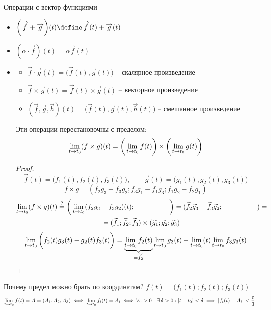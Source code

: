 \begin{undefthm}{Операции с вектор-функциями}
	\hfill
	\begin{itemize}
		\item $ \bigg( \vec{f} + \vec{g} \bigg )(t) \define \vec{f}(t) + \vec{g}(t) $
		\item $ (\alpha \cdot \vec{f})(t) = \alpha \vec{f}(t) $
		\item
		\begin{itemize}
			\item $ \vec{f} \cdot \vec{g}(t) = \bigg( \vec{f}(t), \vec{g}(t) \bigg) $ -- скалярное произведение
			\item $ \vec{f} \times \vec{g}(t) = \vec{f}(t) \times \vec{g}(t) $ -- векторное произведение
			\item $ (\vec{f}, \vec{g}, \vec{h})(t) = \bigg( \vec{f}(t), \vec{g}(t), \vec{h}(t) \bigg) $ -- смешанное произведение
		\end{itemize}
		\begin{statement}
			Эти операции перестановочны с пределом:
			$$ \lim\limits_{t \to t_0} (f \times g)(t) = \bigg( \lim\limits_{t \to t_0}f(t) \bigg) \times \bigg( \lim\limits_{t \to t_0}g(t) \bigg) $$
		\end{statement}
		\begin{proof}
			$$ \vec{f}(t) = \bigg( f_1(t), f_2(t), f_3(t) \bigg), \qquad \vec{g}(t) = \bigg( g_1(t), g_2(t), g_3(t) \bigg) $$
			$$ f \times g = ( f_2g_3 - f_3g_2; f_3g_1 - f_1g_3; f_1g_2 - f_2g_1) $$
			\begin{multline*}
				\liml{t \to t_0}(f \times g)(t) \stackrel?= \bigg( \liml{t \to t_0}(f_2g_3 - f_3g_2)(t); \widedots[5em] \bigg) = (\vawe{f_2}\vawe{g_3} - \vawe{f_3}\vawe{g_2}; \widedots[5em]) = \\
				= (\vawe{f_1}; \vawe{f_2}; \vawe{f_3}) \times (\vawe{g_1}; \vawe{g_2}; \vawe{g_3})
			\end{multline*}
			$$ \lim\limits_{t \to t_0} \bigg( f_2(t)g_3(t) - g_2(t)f_3(t) \bigg) = \underbrace{\lim\limits_{t \to t_0} f_2(t)}_{= \widetilde{f_2}} \lim\limits_{t \to t_0}g_3(t) - \lim\limits_{t \to t_0}(t) \lim\limits_{t \to t_0}f_3g_3(t) $$
		\end{proof}
	\end{itemize}
\end{undefthm}

\begin{undefthm}{Почему предел можно брать по координатам?}
	$ f(t) = \bigg( f_1(t); f_2(t); f_3(t) \bigg) $
	$$ \lim\limits_{t \to t_0} f(t) = A = (A_1, A_2, A_3) \iff \lim\limits_{t \to t_0} f_i(t) = A_i \iff \forall \varepsilon > 0 \quad \exists\, \delta > 0 : |t - t_0| < \delta \implies |f_i(t) - A_i| < \frac{\varepsilon}3 $$
\end{undefthm}

